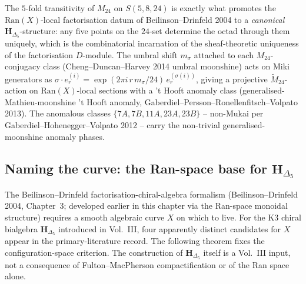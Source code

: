 \begin{remark}
\label{rem:confspaces-2}
The $5$-fold transitivity of $M_{24}$ on $S(5,8,24)$ is exactly what
promotes the $\mathrm{Ran}(X)$-local factorisation datum of Beilinson--Drinfeld
2004 to a \emph{canonical} $\mathbf H_{\Delta_5}$-structure: any five
points on the $24$-set determine the octad through them uniquely, which
is the combinatorial incarnation of the sheaf-theoretic uniqueness of
the factorisation $D$-module. The umbral shift $m_\sigma$ attached to
each $M_{24}$-conjugacy class (Cheng--Duncan--Harvey 2014 umbral moonshine)
acts on Miki generators as
$\sigma\cdot e^{(i)}_r = \exp(2\pi i \, r \, m_\sigma /24)\, e^{(\sigma(i))}_r$,
giving a projective $\widetilde{M}_{24}$-action on $\mathrm{Ran}(X)$-local
sections with a 't Hooft anomaly class (generalised-Mathieu-moonshine
't Hooft anomaly, Gaberdiel--Persson--Ronellenfitsch--Volpato 2013). The
anomalous classes
$\{7A, 7B, 11A, 23A, 23B\}$ -- non-Mukai per Gaberdiel--Hohenegger--Volpato
2012 -- carry the non-trivial generalised-moonshine anomaly phases.
\end{remark}

\subsection{Naming the curve: the Ran-space base for $\mathbf{H}_{\Delta_5}$}
\label{subsec:confspaces-name-the-curve}

The Beilinson--Drinfeld factorisation-chiral-algebra formalism
(Beilinson--Drinfeld 2004, Chapter~3; developed earlier in this chapter
via the Ran-space monoidal structure) requires a smooth algebraic
curve $X$ on which to live. For the K3 chiral bialgebra $\mathbf{H}_{\Delta_5}$
introduced in Vol.~III, four apparently distinct candidates for $X$
appear in the primary-literature record. The following theorem fixes
the configuration-space criterion. The construction of
$\mathbf H_{\Delta_5}$ itself is a Vol.~III input, not a consequence of
Fulton--MacPherson compactification or of the Ran space alone.

